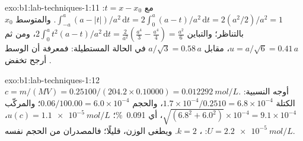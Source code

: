 \begin{solution}{exo:b1:lab-techniques-1:11}
مع $t = x - x_0$: $\int_{-a}^{a} (a - |t|)/a^2 \,\mathrm{d}t =
2 \int_0^a (a - t)/a^2 \,\mathrm{d}t = 2 (a^2/2)/a^2 = 1$. والمتوسط
$x_0$ بالتناظر؛ والتباين $2 \int_0^a t^2 (a - t)/a^2
\,\mathrm{d}t = \frac{2}{a^2}\left(\frac{a^4}{3} - \frac{a^4}{4}\right) =
\frac{a^2}{6}$، ومن ثم $u = a/\sqrt6 = 0.41\,a$، مقابل $a/\sqrt3 = 0.58\,a$
في الحالة المستطيلة: فمعرفة أن الوسط أرجح تخفض
.
\end{solution}

\begin{solution}{exo:b1:lab-techniques-1:12}
$c = m/(MV) = 0.25100/(204.2 \times 0.10000) = \qty{0.012292}{mol/L}$.
أوجه  النسبية: الكتلة $1.7 \times 10^{-4}/0.2510 = 6.8 \times
10^{-4}$، والحجم $0.06/100.00 = 6.0 \times 10^{-4}$؛ والمركّب
$\sqrt{(6.8^2 + 6.0^2)} \times 10^{-4} = 9.1 \times 10^{-4}$، أي
\qty{0.091}{\percent}؛ $u(c) = \qty{1.1e-5}{mol/L}$، $U = \qty{2.2e-5}{mol/L}$:
، $k = 2$. ويطغى الوزن،
قليلًا؛ فالمصدران من الحجم نفسه.
\end{solution}

